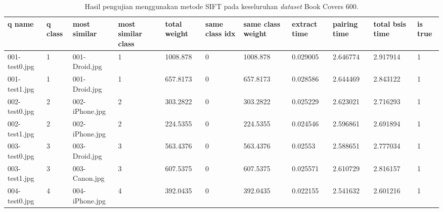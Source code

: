\begin{landscape}
	\begin{longtable}{|p{2cm}|p{1cm}|p{2cm}|p{1cm}|p{2cm}|p{1cm}|p{2cm}|p{2cm}|p{2cm}|p{2cm}|p{1cm}|}
		\caption{Hasil pengujian menggunakan metode SIFT pada keseluruhan \textit{dataset} Book Covers 600.} \\
		\hline
		\textbf{q name} & \textbf{q class} & \textbf{most similar} & \textbf{most similar class} & \textbf{total weight} & \textbf{same class idx} & \textbf{same class weight} & \textbf{extract time} & \textbf{pairing time} & \textbf{total bsis time} & \textbf{is true} \\ \hline
		001-test0.jpg   & 1                & 001-Droid.jpg         & 1                           & 1008.878              & 0                       & 1008.878                   & 0.029005              & 2.646774              & 2.917914                 & 1                \\ \hline
		001-test1.jpg   & 1                & 001-Droid.jpg         & 1                           & 657.8173              & 0                       & 657.8173                   & 0.028586              & 2.644469              & 2.843122                 & 1                \\ \hline
		002-test0.jpg   & 2                & 002-iPhone.jpg        & 2                           & 303.2822              & 0                       & 303.2822                   & 0.025229              & 2.623021              & 2.716293                 & 1                \\ \hline
		002-test1.jpg   & 2                & 002-iPhone.jpg        & 2                           & 224.5355              & 0                       & 224.5355                   & 0.024546              & 2.596861              & 2.691894                 & 1                \\ \hline
		003-test0.jpg   & 3                & 003-Droid.jpg         & 3                           & 563.4376              & 0                       & 563.4376                   & 0.02553               & 2.588651              & 2.777034                 & 1                \\ \hline
		003-test1.jpg   & 3                & 003-Canon.jpg         & 3                           & 607.5375              & 0                       & 607.5375                   & 0.025571              & 2.610729              & 2.816157                 & 1                \\ \hline
		004-test0.jpg   & 4                & 004-iPhone.jpg        & 4                           & 392.0435              & 0                       & 392.0435                   & 0.022155              & 2.541632              & 2.601216                 & 1                \\ \hline

\end{longtable}
\end{landscape}

